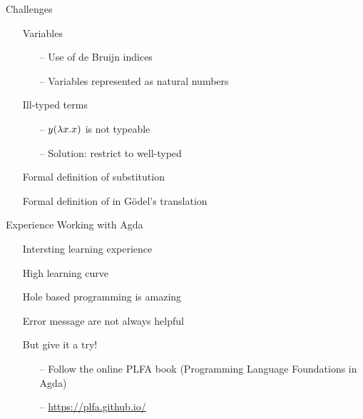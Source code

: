 \documentclass{beamer}
\theoremstyle{definition}
\begin{document}
  \begin{frame}{Challenges}
    \begin{itemize}
      \item[\textbullet] Variables \pause
        \begin{itemize}
          \item[--] Use of \alert{de Bruijn indices} \pause
          \item[--] Variables represented as natural numbers \pause
        \end{itemize}
      \item[\textbullet] Ill-typed terms \pause
        \begin{itemize}
          \item[--] \lterm $y (\lambda {x}.{x})$ is not typeable \pause
          \item[--] Solution: restrict to \alert{well-typed} \lterms \pause
        \end{itemize}
      \item[\textbullet] Formal definition of \alert{substitution} \pause
      \item[\textbullet] Formal definition of \alert{\raiseembn} in Gödel's translation %
    \end{itemize}
  \end{frame}

  \begin{frame}{Experience Working with Agda}
    \begin{itemize}
      \item[\textbullet] Intersting learning experience \pause
      \item[\textbullet] High learning curve \pause
      \item[\textbullet] Hole based programming is amazing \pause
      \item[\textbullet] Error message are not always helpful \pause 
      \item[\textbullet] But give it a try! \pause
        \begin{itemize}
          \item[--] Follow the online \alert{PLFA} book (Programming Language Foundations in Agda) \pause
          \item[--] \alert{\url{https://plfa.github.io/}} 
        \end{itemize}  
    \end{itemize}
  \end{frame}
\end{document}
